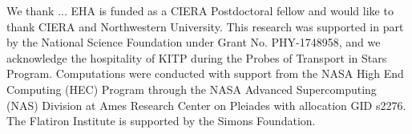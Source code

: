\documentclass[onecolumn, twocolappendix]{aastex631}
\begin{document}




\begin{acknowledgments}
We thank ...
EHA is funded as a CIERA Postdoctoral fellow and would like to thank CIERA and Northwestern University. 
This research was supported in part by the National Science Foundation under Grant No. PHY-1748958, and we acknowledge the hospitality of KITP during the Probes of Transport in Stars Program.
Computations were conducted with support from the NASA High End Computing (HEC) Program through the NASA Advanced Supercomputing (NAS) Division at Ames Research Center on Pleiades with allocation GID s2276.
The Flatiron Institute is supported by the Simons Foundation.
\end{acknowledgments}




\end{document}
